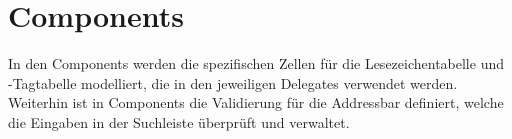 
\section{Components}

In den Components werden die spezifischen Zellen für die Lesezeichentabelle und \SEARCH-Tagtabelle modelliert, die in den jeweiligen Delegates verwendet werden. Weiterhin ist in Components die Validierung für die Addressbar definiert, welche die Eingaben in der Suchleiste überprüft und verwaltet.
